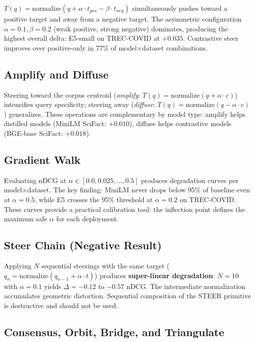 \documentclass{article}
\begin{document}
$T(q) = \text{normalize}(q + \alpha \cdot t_{pos} - \beta \cdot t_{neg})$ simultaneously pushes toward a positive target and away from a negative target. The asymmetric configuration $\alpha{=}0.1, \beta{=}0.2$ (weak positive, strong negative) dominates, producing the highest overall delta: E5-small on TREC-COVID at $+0.035$. Contrastive steer improves over positive-only in 77\% of model$\times$dataset combinations.

\subsection{Amplify and Diffuse}

Steering toward the corpus centroid (\emph{amplify}: $T(q) = \text{normalize}(q + \alpha \cdot c)$) intensifies query specificity; steering away (\emph{diffuse}: $T(q) = \text{normalize}(q - \alpha \cdot c)$) generalizes. These operations are complementary by model type: amplify helps distilled models (MiniLM SciFact: $+0.010$), diffuse helps contrastive models (BGE-base SciFact: $+0.018$).

\subsection{Gradient Walk}

Evaluating nDCG at $\alpha \in [0.0, 0.025, \ldots, 0.5]$ produces degradation curves per model$\times$dataset. The key finding: MiniLM never drops below 95\% of baseline even at $\alpha{=}0.5$, while E5 crosses the 95\% threshold at $\alpha{=}0.2$ on TREC-COVID. These curves provide a practical calibration tool: the inflection point defines the maximum safe $\alpha$ for each deployment.

\subsection{Steer Chain (Negative Result)}

Applying $N$ sequential steerings with the same target ($q_n = \text{normalize}(q_{n-1} + \alpha \cdot t)$) produces \textbf{super-linear degradation}: $N{=}10$ with $\alpha{=}0.1$ yields $\Delta = -0.12$ to $-0.57$ nDCG. The intermediate normalization accumulates geometric distortion. Sequential composition of the STEER primitive is destructive and should not be used.

\subsection{Consensus, Orbit, Bridge, and Triangulate}
\end{document}
